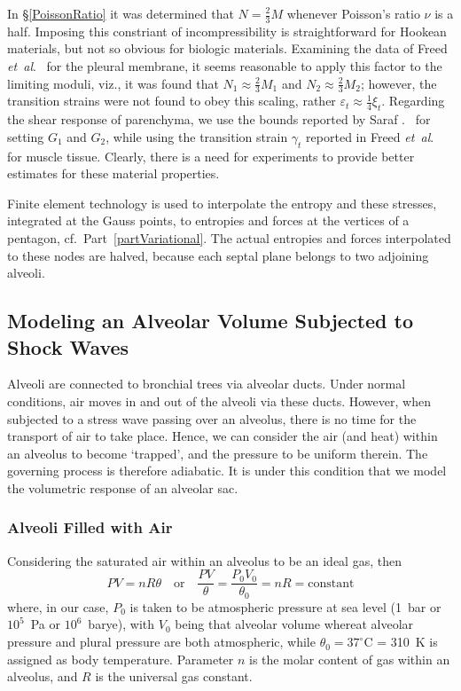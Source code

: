 In \S\ref{PoissonRatio} it was determined that $N = \tfrac{2}{3} M$ whenever Poisson's ratio $\nu$ is a half.  Imposing this constriant of incompressibility is straightforward for Hookean materials, but not so obvious for biologic materials.  Examining the data of Freed \textit{et~al}.\ \cite{Freedetal17} for the pleural membrane, it seems reasonable to apply this factor to the limiting moduli, viz., it was found that $N_1 \approx \tfrac{2}{3} M_1$ and $N_2 \approx \tfrac{2}{3} M_2$; however, the transition strains were not found to obey this scaling, rather $\varepsilon_t \approx \tfrac{1}{4} \xi_t$.  Regarding the shear response of parenchyma, we use the bounds reported by Saraf .\ \cite{Sarafetal07} for setting $G_1$ and $G_2$, while using the transition strain $\gamma_t$ reported in Freed \textit{et~al}.\ \cite{Freedetal17} for muscle tissue.  Clearly, there is a need for experiments to provide better estimates for these material properties.

Finite element technology is used to interpolate the entropy and these stresses, integrated at the Gauss points, to entropies and forces at the vertices of a pentagon, cf.\ Part~\ref{partVariational}.  The actual entropies and forces interpolated to these nodes are halved, because each septal plane belongs to two adjoining alveoli. 

\subsection{Modeling an Alveolar Volume Subjected to Shock Waves}
\label{sec:IdealGasLaw}

Alveoli are connected to bronchial trees via alveolar ducts.  Under normal conditions, air moves in and out of the alveoli via these ducts.  However, when subjected to a stress wave passing over an alveolus, there is no time for the transport of air to take place.  Hence, we can consider the air (and heat) within an alveolus to become `trapped', and the pressure to be uniform therein.  The governing process is therefore adiabatic.  It is under this condition that we model the volumetric response of an alveolar sac.

\subsubsection{Alveoli Filled with Air}

Considering the saturated air within an alveolus to be an ideal gas, then \cite{Davison08}
\begin{equation}
P V = n \! R \theta
\quad \text{or} \quad
\frac{P V}{\theta} = \frac{P_0 V_0}{\theta_0} = n \! R = \mathrm{constant}
\label{idealGas}
\end{equation}
where, in our case, $P_0$ is taken to be atmospheric pressure at sea level (1~bar or $10^5$~Pa or $10^6$~barye), with $V_0$ being that alveolar volume whereat alveolar pressure and plural pressure are both atmospheric, while $\theta_0 = 37^{\circ}$C = 310~K is assigned as body temperature.  Parameter $n$ is the molar content of gas within an alveolus, and $R$ is the universal gas constant.  

